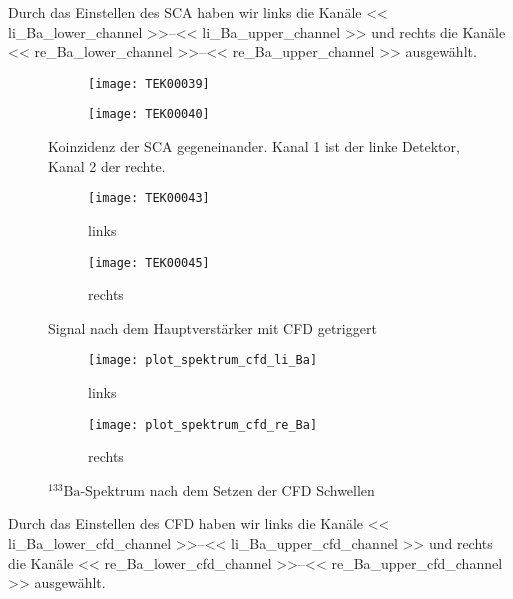 \documentclass[11pt, ngerman, fleqn, DIV=15, headinclude, BCOR=2cm]{scrreprt}
\begin{document}
Durch das Einstellen des SCA haben wir links die Kanäle
\numrange{<< li_Ba_lower_channel >>}{<< li_Ba_upper_channel >>} und rechts
die Kanäle
\numrange{<< re_Ba_lower_channel >>}{<< re_Ba_upper_channel >>} ausgewählt.


\begin{figure}
	\centering
	\begin{subfigure}{0.49 \textwidth}
		\texttt{[image: TEK00039]}
	\end{subfigure}
	\begin{subfigure}{0.49 \textwidth}
		\texttt{[image: TEK00040]}
	\end{subfigure}
	\caption{%
		Koinzidenz der SCA gegeneinander. Kanal 1 ist der linke
		Detektor, Kanal 2 der rechte.
	}
	\label{fig:ba_slow_signal_sca_koinzidenz}
\end{figure}



\begin{figure}
	\centering
	\begin{subfigure}{0.49 \textwidth}
		\texttt{[image: TEK00043]}
		\caption{%
			links
		}
		\label{fig:ba_fast_signal_cfd_trig-li}
	\end{subfigure}
	\begin{subfigure}{0.49 \textwidth}
		\texttt{[image: TEK00045]}
		\caption{%
			rechts
		}
		\label{fig:ba_fast_signal_cfd_trig-re}
	\end{subfigure}
	\caption{%
		Signal nach dem Hauptverstärker mit CFD getriggert
	}
	\label{fig:ba_fast_signal_cfd_trig}
\end{figure}

\begin{figure}
	\centering
	\begin{subfigure}{0.49 \textwidth}
		\texttt{[image: plot\_spektrum\_cfd\_li\_Ba]}
		\caption{%
			links
		}
		\label{fig:ba_fast_signal_cfd_plot-li}
	\end{subfigure}
	\begin{subfigure}{0.49 \textwidth}
		\texttt{[image: plot\_spektrum\_cfd\_re\_Ba]}
		\caption{%
			rechts
		}
		\label{fig:ba_fast_signal_cfd_plot-re}
	\end{subfigure}
	\caption{%
		$^{133}\text{Ba}$-Spektrum nach dem Setzen der CFD Schwellen
	}
	\label{fig:ba_fast_signal_cfd_plot}
\end{figure}

Durch das Einstellen des CFD haben wir links die Kanäle
\numrange{<< li_Ba_lower_cfd_channel >>}{<< li_Ba_upper_cfd_channel >>} und rechts
die Kanäle
\numrange{<< re_Ba_lower_cfd_channel >>}{<< re_Ba_upper_cfd_channel >>} ausgewählt.
\end{document}
